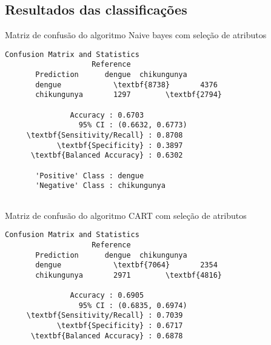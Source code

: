 \begin{apendicesenv}

\partapendices

\chapter{Resultados das classificações}

\begin{quadro}
\caption{\label{quadro:naive2}Matriz de confusão do algoritmo Naive bayes com seleção de atributos}
\begingroup
    \fontsize{10pt}{9pt}\selectfont
    \begin{Verbatim}[commandchars=\\\{\}]
      Confusion Matrix and Statistics
                    Reference
       Prediction      dengue  chikungunya
       dengue            \textbf{8738}       4376
       chikungunya       1297        \textbf{2794}
                                         
               Accuracy : 0.6703         
                 95% CI : (0.6632, 0.6773)     
     \textbf{Sensitivity/Recall} : 0.8708         
            \textbf{Specificity} : 0.3897         
      \textbf{Balanced Accuracy} : 0.6302
         
       'Positive' Class : dengue 
       'Negative' Class : chikungunya
  
    \end{Verbatim}  
\endgroup
{}
\end{quadro}


\begin{quadro}
\caption{\label{quadro:cart2}Matriz de confusão do algoritmo CART com seleção de atributos}
\begingroup
    \fontsize{10pt}{9pt}\selectfont
    \begin{Verbatim}[commandchars=\\\{\}]
      Confusion Matrix and Statistics
                    Reference
       Prediction      dengue  chikungunya
       dengue            \textbf{7064}       2354
       chikungunya       2971        \textbf{4816}
                                         
               Accuracy : 0.6905         
                 95% CI : (0.6835, 0.6974)      
     \textbf{Sensitivity/Recall} : 0.7039         
            \textbf{Specificity} : 0.6717         
      \textbf{Balanced Accuracy} : 0.6878
         

\end{Verbatim}
\end{quadro}
\end{apendicesenv}
